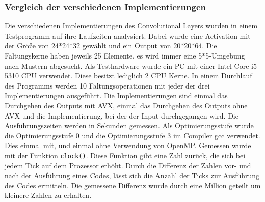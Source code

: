 \documentclass[../main.tex]{subfiles}
\begin{document}
\subsubsection{Vergleich der verschiedenen Implementierungen}

Die verschiedenen Implementierungen des Convolutional Layers wurden in einem Testprogramm auf ihre Laufzeiten analysiert. Dabei wurde eine Activation mit der Größe von 24*24*32 gewählt und ein Output von 20*20*64. Die Faltungskerne haben jeweils 25 Elemente, es wird immer eine 5*5-Umgebung nach Mustern abgesucht.
Als Testhardware wurde ein PC mit einer Intel Core i5-5310 CPU verwendet. Diese besitzt lediglich 2 CPU Kerne.
In einem Durchlauf des Programms werden 10 Faltungsoperationen mit jeder der drei Implementierungen ausgeführt. Die Implementierungen sind einmal das Durchgehen des Outputs mit AVX, einmal das Durchgehen des Outputs ohne AVX und die Implementierung, bei der der Input durchgegangen wird. Die Ausführungszeiten werden in Sekunden gemessen. 
Als Optimierungsstufe wurde die Optimierungsstufe 0 und die Optimierungsstufe 3 im Compiler gcc verwendet. Dies einmal mit, und einmal ohne Verwendung von OpenMP.
Gemessen wurde mit der Funktion \texttt{clock()}. Diese Funktion gibt eine Zahl zurück, die sich bei  jedem Tick auf dem Prozessor erhöht. Durch die Differenz der Zahlen vor- und nach der Ausführung eines Codes, lässt sich die Anzahl der Ticks zur Ausführung des Codes ermitteln. Die gemessene Differenz wurde durch eine Million geteilt um kleinere Zahlen zu erhalten.
\end{document}
